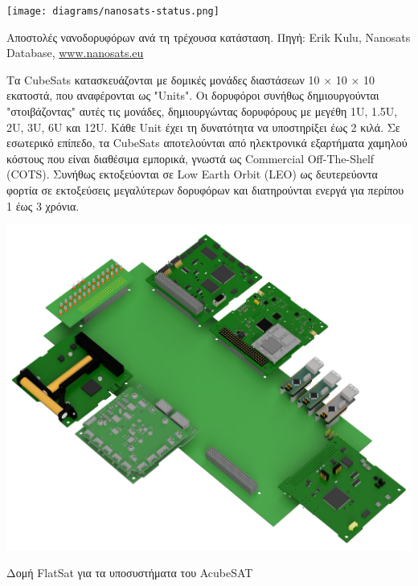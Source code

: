 \documentclass[a4paper,nobib,justified]{tufte-book}
\begin{document}
\begin{marginfigure}
	\texttt{[image: diagrams/nanosats-status.png]}
	\label{diag:nanosats-status}
	\caption[Αποστολές νανοδορυφόρων ανά τη τρέχουσα κατάσταση]{Αποστολές νανοδορυφόρων ανά τη τρέχουσα κατάσταση. Πηγή: Erik Kulu, Nanosats Database, \href{https://www.nanosats.eu}{www.nanosats.eu}}
\end{marginfigure}
Τα CubeSats κατασκευάζονται με δομικές μονάδες διαστάσεων 10 × 10 × 10 εκατοστά, που αναφέρονται ως "Units". Οι δορυφόροι συνήθως δημιουργούνται "στοιβάζοντας" αυτές τις μονάδες, δημιουργώντας δορυφόρους με μεγέθη 1U, 1.5U, 2U, 3U, 6U και 12U. Κάθε Unit έχει τη δυνατότητα να υποστηρίξει έως 2 κιλά. Σε εσωτερικό επίπεδο, τα CubeSats αποτελούνται από ηλεκτρονικά εξαρτήματα χαμηλού κόστους που είναι διαθέσιμα εμπορικά, γνωστά ως Commercial Off-The-Shelf (COTS). Συνήθως εκτοξεύονται σε Low Earth Orbit (LEO) ως δευτερεύοντα φορτία σε εκτοξεύσεις μεγαλύτερων δορυφόρων και διατηρούνται ενεργά για περίπου 1 έως 3 χρόνια.
\begin{marginfigure}
	\includegraphics[width=1\linewidth]{media/images/flatsat.png}
	\label{fig:flatsat}
	\caption{Δομή FlatSat για τα υποσυστήματα του AcubeSAT}
\end{marginfigure}
\end{document}
